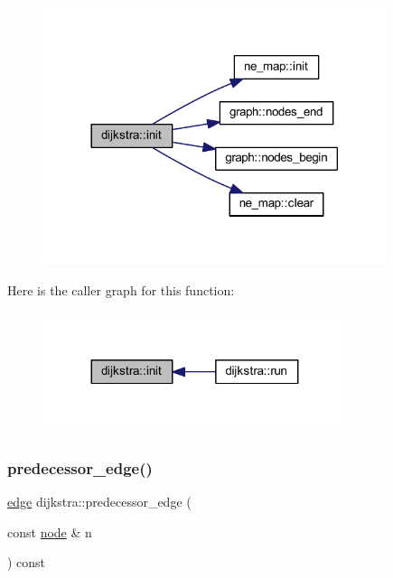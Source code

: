 \begin{figure}[H]
\begin{center}
\leavevmode
\includegraphics[width=284pt]{classdijkstra_a6dafb552780e09a56b87e2a33a98e74b_cgraph}
\end{center}
\end{figure}
Here is the caller graph for this function\+:\nopagebreak
\begin{figure}[H]
\begin{center}
\leavevmode
\includegraphics[width=251pt]{classdijkstra_a6dafb552780e09a56b87e2a33a98e74b_icgraph}
\end{center}
\end{figure}
\mbox{\label{classdijkstra_aa3ef1a7d7dfc33e4a39aff309f873929}} 
\subsubsection{\texorpdfstring{predecessor\+\_\+edge()}{predecessor\_edge()}}
{\footnotesize\ttfamily \mbox{\hyperlink{classedge}{edge}} dijkstra\+::predecessor\+\_\+edge (\begin{DoxyParamCaption}\item[{const \mbox{\hyperlink{classnode}{node}} \&}]{n }\end{DoxyParamCaption}) const}



